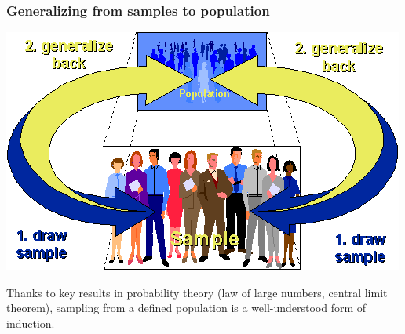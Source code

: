 \documentclass{beamer}
\begin{document}
\begin{frame}
\frametitle{Generalizing from samples to population}
\begin{center}
\includegraphics[scale = 0.3]{extsamp.png}
\end{center}
Thanks to key results in probability theory (law of large numbers, central limit theorem), sampling from a defined population is a well-understood form of induction.
\end{frame}
\end{document}
